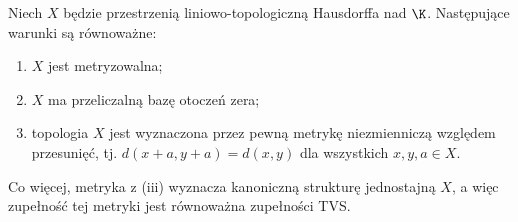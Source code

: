 \begin{twierdzenie}
\label{thm:tvs-metrizable}
Niech $X$ będzie przestrzenią liniowo-topologiczną
Hausdorffa nad $\K$. Następujące warunki są równoważne:
\begin{enumerate}[label=\textup{(\roman*)}]
\item $X$ jest metryzowalna;
\item $X$ ma przeliczalną bazę otoczeń zera;
\item topologia $X$ jest wyznaczona przez pewną
      metrykę niezmienniczą względem przesunięć,
      tj. $d(x+a,y+a)=d(x,y)$ dla wszystkich $x,y,a\in X$.
\end{enumerate}
Co więcej, metryka z (iii) wyznacza kanoniczną strukturę
jednostajną $X$, a więc zupełność tej metryki jest
równoważna zupełności TVS.
\end{twierdzenie}
